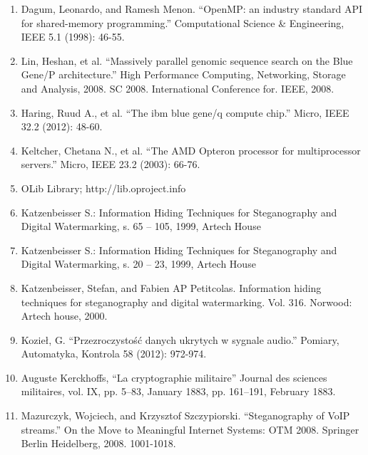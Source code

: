 \documentclass[10pt, a5paper]{article}
\begin{document}
\begin{enumerate}
  \item Dagum, Leonardo, and Ramesh Menon. ``OpenMP: an industry standard API for shared-memory programming.'' Computational Science \& Engineering, IEEE 5.1 (1998): 46-55.
  \item Lin, Heshan, et al. ``Massively parallel genomic sequence search on the Blue Gene/P architecture.'' High Performance Computing, Networking, Storage and Analysis, 2008. SC 2008. International Conference for. IEEE, 2008.
  \item Haring, Ruud A., et al. ``The ibm blue gene/q compute chip.'' Micro, IEEE 32.2 (2012): 48-60.
  \item Keltcher, Chetana N., et al. ``The AMD Opteron processor for multiprocessor servers.'' Micro, IEEE 23.2 (2003): 66-76.
  \item OLib Library; http://lib.oproject.info
  \item Katzenbeisser S.: Information Hiding Techniques for Steganography and Digital Watermarking, s. 65 -- 105, 1999, Artech House
  \item Katzenbeisser S.: Information Hiding Techniques for Steganography and Digital Watermarking, s. 20 -- 23, 1999, Artech House
  \item Katzenbeisser, Stefan, and Fabien AP Petitcolas. Information hiding techniques for steganography and digital watermarking. Vol. 316. Norwood: Artech house, 2000.
  \item Kozieł, G. ``Przezroczystość danych ukrytych w sygnale audio.'' Pomiary, Automatyka, Kontrola 58 (2012): 972-974.
  \item Auguste Kerckhoffs, ``La cryptographie militaire'' Journal des sciences militaires, vol. IX, pp. 5–83, January 1883, pp. 161–191, February 1883.
  \item Mazurczyk, Wojciech, and Krzysztof Szczypiorski. ``Steganography of VoIP streams.'' On the Move to Meaningful Internet Systems: OTM 2008. Springer Berlin Heidelberg, 2008. 1001-1018.
\end{enumerate}
\end{document}
